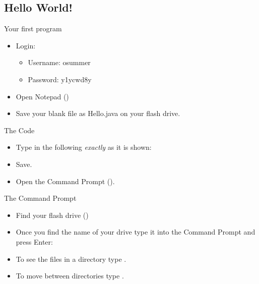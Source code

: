 \subsection{Hello World!}
\begin{frame}{Your first program}
\begin{itemize}
\item Login:
\begin{itemize}
\item Username: osummer
\item Password: y1ycwd8y
\end{itemize} \pause
\item Open Notepad ()\pause
\item Save your blank file as Hello.java on your flash drive.\pause
\end{itemize}
\end{frame}

\begin{frame}[fragile]{The Code}
\begin{itemize}
\item Type in the following \emph{exactly} as it is shown:\\
\begin{semiverbatim}
\end{semiverbatim}
\item Save.
\item Open the Command Prompt ().

\end{itemize}
\end{frame}

\begin{frame}[fragile]{The Command Prompt}
\begin{itemize}
\item Find your flash drive ()\pause
\item Once you find the name of your drive type it into the Command Prompt and press Enter:
\begin{semiverbatim}\end{semiverbatim}
\item To see the files in a directory type .
\item To move between directories type .
\end{itemize}
\end{frame}


